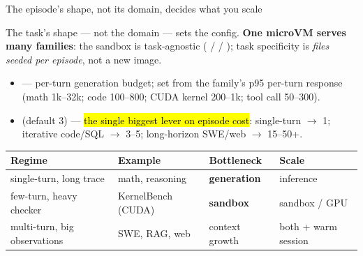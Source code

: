 \begin{frame}{The episode's shape, not its domain, decides what you scale}
{\footnotesize The task's shape --- not the domain --- sets the config. \textbf{One microVM serves many families}: the sandbox is task-agnostic ( /  / ); task specificity is \emph{files seeded per episode}, not a new image.\par}
\vspace{1mm}
\begin{itemize}\scriptsize\setlength{\itemsep}{1mm}
\item \textbf{} --- per-turn generation budget; set from the family's p95 per-turn response (math 1k--32k; code 100--800; CUDA kernel 200--1k; tool call 50--300).
\item \textbf{} (default 3) --- \hl{the single biggest lever on episode cost}: single-turn $\rightarrow$ 1; iterative code/SQL $\rightarrow$ 3--5; long-horizon SWE/web $\rightarrow$ 15--50+.
\end{itemize}
\vspace{1mm}
\footnotesize
\begin{tabularx}{\textwidth}{@{}l Y l l@{}}
\toprule
\textbf{Regime} & \textbf{Example} & \textbf{Bottleneck} & \textbf{Scale}\\
\midrule
single-turn, long trace & math, reasoning & \textbf{generation} & inference\\
few-turn, heavy checker & KernelBench (CUDA) & \textbf{sandbox} & sandbox / GPU\\
multi-turn, big observations & SWE, RAG, web & context growth & both + warm session\\
\bottomrule
\end{tabularx}
\end{frame}

